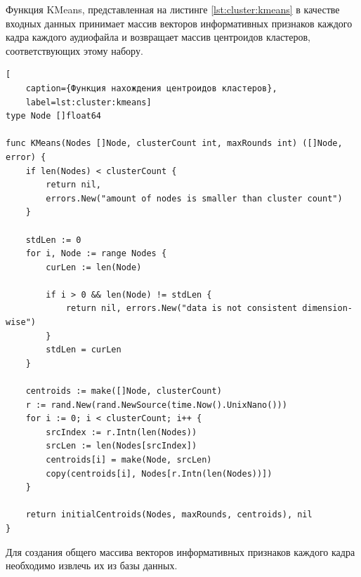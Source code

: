 Функция KMeans, представленная на листинге \ref{lst:cluster:kmeans} в качестве входных данных принимает массив векторов информативных признаков каждого кадра каждого аудиофайла и возвращает массив центроидов кластеров, соответствующих этому набору.
\begin{lstlisting}[
	caption={Функция нахождения центроидов кластеров},
	label=lst:cluster:kmeans]
type Node []float64
	
func KMeans(Nodes []Node, clusterCount int, maxRounds int) ([]Node, error) {
	if len(Nodes) < clusterCount {
		return nil, 
		errors.New("amount of nodes is smaller than cluster count")
	}
	
	stdLen := 0
	for i, Node := range Nodes {
		curLen := len(Node)
		
		if i > 0 && len(Node) != stdLen {
			return nil, errors.New("data is not consistent dimension-wise")
		}
		stdLen = curLen
	}
	
	centroids := make([]Node, clusterCount)
	r := rand.New(rand.NewSource(time.Now().UnixNano()))
	for i := 0; i < clusterCount; i++ {
		srcIndex := r.Intn(len(Nodes))
		srcLen := len(Nodes[srcIndex])
		centroids[i] = make(Node, srcLen)
		copy(centroids[i], Nodes[r.Intn(len(Nodes))])
	}
	
	return initialCentroids(Nodes, maxRounds, centroids), nil
}
\end{lstlisting}
Для создания общего массива векторов информативных признаков каждого кадра необходимо извлечь их из базы данных. 

